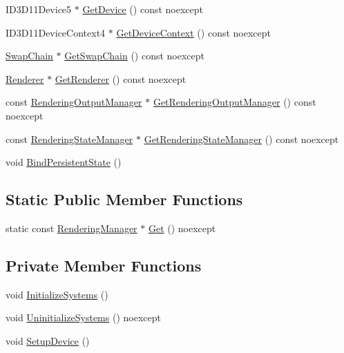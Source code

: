 \begin{DoxyCompactItemize}
I\+D3\+D11\+Device5 $\ast$ \hyperlink{classmage_1_1_rendering_manager_a92dc62ffd2e86652edd86739ff878ac2}{Get\+Device} () const noexcept
\item 
I\+D3\+D11\+Device\+Context4 $\ast$ \hyperlink{classmage_1_1_rendering_manager_a8067ea5d29a3f986dfdbd90ed1b956ee}{Get\+Device\+Context} () const noexcept
\item 
\hyperlink{classmage_1_1_swap_chain}{Swap\+Chain} $\ast$ \hyperlink{classmage_1_1_rendering_manager_a867d9d3986a38c98562cf0cfe9797fe0}{Get\+Swap\+Chain} () const noexcept
\item 
\hyperlink{classmage_1_1_renderer}{Renderer} $\ast$ \hyperlink{classmage_1_1_rendering_manager_a5b357f9f7e241945ac396cd09ba3be7e}{Get\+Renderer} () const noexcept
\item 
const \hyperlink{classmage_1_1_rendering_output_manager}{Rendering\+Output\+Manager} $\ast$ \hyperlink{classmage_1_1_rendering_manager_ad24d51b141e5579a3bd8fc63793977fe}{Get\+Rendering\+Output\+Manager} () const noexcept
\item 
const \hyperlink{classmage_1_1_rendering_state_manager}{Rendering\+State\+Manager} $\ast$ \hyperlink{classmage_1_1_rendering_manager_a762283c6474287a874f8e8667f69a165}{Get\+Rendering\+State\+Manager} () const noexcept
\item 
void \hyperlink{classmage_1_1_rendering_manager_adadab213b9aabdc6167a012d340084a6}{Bind\+Persistent\+State} ()
\end{DoxyCompactItemize}
\subsection*{Static Public Member Functions}
\begin{DoxyCompactItemize}
\item 
static const \hyperlink{classmage_1_1_rendering_manager}{Rendering\+Manager} $\ast$ \hyperlink{classmage_1_1_rendering_manager_a920fdd741d160b687ecac1d892f8bfd1}{Get} () noexcept
\end{DoxyCompactItemize}
\subsection*{Private Member Functions}
\begin{DoxyCompactItemize}
\item 
void \hyperlink{classmage_1_1_rendering_manager_a80812ecd5c9757b961e46e6bb7533566}{Initialize\+Systems} ()
\item 
void \hyperlink{classmage_1_1_rendering_manager_a3665d58d2a9e8995a348b5f2bd723d8b}{Uninitialize\+Systems} () noexcept
\item 
void \hyperlink{classmage_1_1_rendering_manager_a45d4cadcd572290f352027b5fa86b4f6}{Setup\+Device} ()
\end{DoxyCompactItemize}
